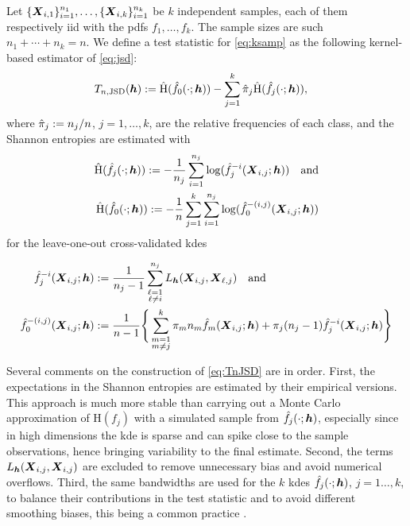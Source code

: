 \documentclass[oneside,11pt]{article}
\begin{document}
Let $\{\boldsymbol{X}_{i,1}\}_{i=1}^{n_1},\ldots,\{\boldsymbol{X}_{i,k}\}_{i=1}^{n_k}$ be $k$ independent samples, each of them respectively iid with the pdfs $f_1,\ldots,f_k$. The sample sizes are such $n_1+\cdots+n_k=n$. We define a test statistic for \eqref{eq:ksamp} as the following kernel-based estimator of \eqref{eq:jsd}:
\begin{align}
    T_{n,\mathrm{JSD}}({\boldsymbol{h}}):=&\; \hat{\mathrm{H}}(\hat{f}_0(\cdot;{\boldsymbol{h}}))-\sum_{j=1}^k \hat{\pi}_j \hat{\mathrm{H}}(\hat{f}_j(\cdot;{\boldsymbol{h}})), \label{eq:TnJSD}
\end{align}
where $\hat{\pi}_j:= n_j/n$, $j=1,\ldots,k$, are the relative frequencies of each class, and the Shannon entropies are estimated with
\begin{align}
\begin{aligned}
    \hat{\mathrm{H}}(\hat{f}_j(\cdot;{\boldsymbol{h}})):= -\frac{1}{n_j}\sum_{i=1}^{n_j} \log(\hat{f}_j^{-i}(\boldsymbol{X}_{i,j};{\boldsymbol{h}}))\quad\text{and}\\
    \hat{\mathrm{H}}(\hat{f}_0(\cdot;{\boldsymbol{h}})):= -\frac{1}{n}\sum_{j=1}^k\sum_{i=1}^{n_j} \log(\hat{f}_0^{-(i,j)}(\boldsymbol{X}_{i,j};{\boldsymbol{h}}))
        \end{aligned}
        \label{eq:Hs}
\end{align}
for the leave-one-out cross-validated kdes

\begin{align}
\begin{aligned}
    \hat{f}_j^{-i}(\boldsymbol{X}_{i,j};{\boldsymbol{h}})&:=\frac{1}{n_j-1}\sum_{\substack{\ell=1\\\ell\neq i}}^{n_j} L_{\boldsymbol{h}}(\boldsymbol{X}_{i,j},\boldsymbol{X}_{\ell,j})\quad\text{and}\\
    \hat{f}_0^{-(i,j)}(\boldsymbol{X}_{i,j};{\boldsymbol{h}})&:=
    \frac{1}{n-1}\Bigg\{\sum_{\substack{m=1\\m\neq j}}^k \pi_m n_m \hat{f}_m(\boldsymbol{X}_{i,j};{\boldsymbol{h}})+\pi_j(n_j-1)\hat{f}_j^{-i}(\boldsymbol{X}_{i,j};{\boldsymbol{h}})\Bigg\}
    \end{aligned}
    \label{eq:cvkdes}
\end{align}

Several comments on the construction of \eqref{eq:TnJSD} are in order. First, the expectations in the Shannon entropies are estimated by their empirical versions. This approach is much more stable than carrying out a Monte Carlo approximation of $\mathrm{H}(f_j)$ %
with a simulated sample from %
$\hat{f}_j(\cdot;{\boldsymbol{h}})$, especially since in high dimensions the kde is sparse and can spike close to the sample observations, hence bringing variability to the final estimate. Second, the terms $L_{\boldsymbol{h}}(\boldsymbol{X}_{i,j},\boldsymbol{X}_{i,j})$ are excluded to remove unnecessary bias and avoid numerical overflows. Third, the same bandwidths are used for the $k$ kdes $\hat{f}_j(\cdot;{\boldsymbol{h}})$, $j=1\ldots,k$, to balance their contributions in the test statistic and to avoid different smoothing biases, this being a common practice  \cite[see, e.g.,][]{Mammen1992,Li1996}.
\end{document}
